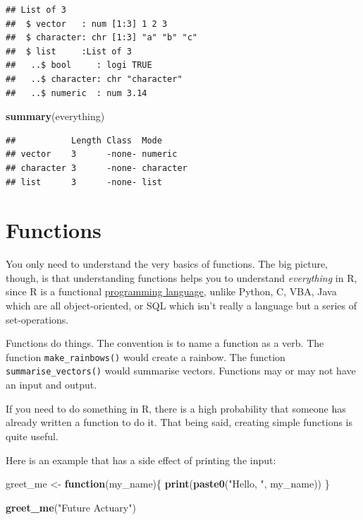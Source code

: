 \documentclass[openany]{book}
\newenvironment{Shaded}{\begin{snugshade}}{\end{snugshade}}
\newcommand{\ControlFlowTok}[1]{\textcolor[rgb]{0.13,0.29,0.53}{\textbf{#1}}}
\newcommand{\KeywordTok}[1]{\textcolor[rgb]{0.13,0.29,0.53}{\textbf{#1}}}
\newcommand{\NormalTok}[1]{#1}
\newcommand{\StringTok}[1]{\textcolor[rgb]{0.31,0.60,0.02}{#1}}
\begin{document}
\begin{verbatim}
## List of 3
##  $ vector   : num [1:3] 1 2 3
##  $ character: chr [1:3] "a" "b" "c"
##  $ list     :List of 3
##   ..$ bool     : logi TRUE
##   ..$ character: chr "character"
##   ..$ numeric  : num 3.14
\end{verbatim}

\begin{Shaded}
\begin{Highlighting}[]
\KeywordTok{summary}\NormalTok{(everything)}
\end{Highlighting}
\end{Shaded}

\begin{verbatim}
##           Length Class  Mode     
## vector    3      -none- numeric  
## character 3      -none- character
## list      3      -none- list
\end{verbatim}

\hypertarget{functions}{%
\section{Functions}\label{functions}}

You only need to understand the very basics of functions. The big picture, though, is that
understanding functions helps you to understand \emph{everything} in R, since R is a
functional \href{http://adv-r.had.co.nz/Functional-programming.html}{programming language},
unlike Python, C, VBA, Java which are all object-oriented, or SQL which isn't
really a language but a series of set-operations.

Functions do things. The convention is to name a function as a verb. The function
\texttt{make\_rainbows()} would create a rainbow. The function \texttt{summarise\_vectors()}
would summarise vectors. Functions may or may not have an input and output.

If you need to do something in R, there is a high probability that someone has
already written a function to do it. That being said, creating simple functions
is quite useful.

Here is an example that has a side effect of printing the input:

\begin{Shaded}
\begin{Highlighting}[]
\NormalTok{greet_me <-}\StringTok{ }\ControlFlowTok{function}\NormalTok{(my_name)\{}
  \KeywordTok{print}\NormalTok{(}\KeywordTok{paste0}\NormalTok{(}\StringTok{"Hello, "}\NormalTok{, my_name))}
\NormalTok{\}}

\KeywordTok{greet_me}\NormalTok{(}\StringTok{"Future Actuary"}\NormalTok{)}
\end{Highlighting}
\end{Shaded}
\end{document}
